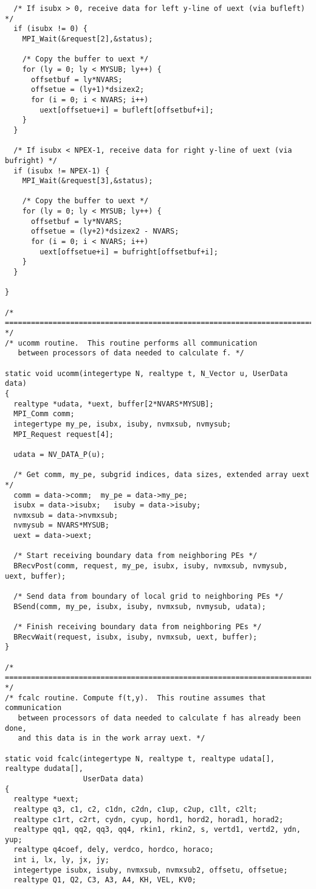 \begin{verbatim}
  /* If isubx > 0, receive data for left y-line of uext (via bufleft) */
  if (isubx != 0) {
    MPI_Wait(&request[2],&status);

    /* Copy the buffer to uext */
    for (ly = 0; ly < MYSUB; ly++) {
      offsetbuf = ly*NVARS;
      offsetue = (ly+1)*dsizex2;
      for (i = 0; i < NVARS; i++)
        uext[offsetue+i] = bufleft[offsetbuf+i];
    }
  }

  /* If isubx < NPEX-1, receive data for right y-line of uext (via bufright) */
  if (isubx != NPEX-1) {
    MPI_Wait(&request[3],&status);

    /* Copy the buffer to uext */
    for (ly = 0; ly < MYSUB; ly++) {
      offsetbuf = ly*NVARS;
      offsetue = (ly+2)*dsizex2 - NVARS;
      for (i = 0; i < NVARS; i++)
        uext[offsetue+i] = bufright[offsetbuf+i];
    }
  }

}

/* ======================================================================= */
/* ucomm routine.  This routine performs all communication 
   between processors of data needed to calculate f. */

static void ucomm(integertype N, realtype t, N_Vector u, UserData data)
{
  realtype *udata, *uext, buffer[2*NVARS*MYSUB];
  MPI_Comm comm;
  integertype my_pe, isubx, isuby, nvmxsub, nvmysub;
  MPI_Request request[4];

  udata = NV_DATA_P(u);

  /* Get comm, my_pe, subgrid indices, data sizes, extended array uext */
  comm = data->comm;  my_pe = data->my_pe;
  isubx = data->isubx;   isuby = data->isuby;
  nvmxsub = data->nvmxsub;
  nvmysub = NVARS*MYSUB;
  uext = data->uext;

  /* Start receiving boundary data from neighboring PEs */
  BRecvPost(comm, request, my_pe, isubx, isuby, nvmxsub, nvmysub, uext, buffer);

  /* Send data from boundary of local grid to neighboring PEs */
  BSend(comm, my_pe, isubx, isuby, nvmxsub, nvmysub, udata);

  /* Finish receiving boundary data from neighboring PEs */
  BRecvWait(request, isubx, isuby, nvmxsub, uext, buffer);
}

/* ======================================================================= */
/* fcalc routine. Compute f(t,y).  This routine assumes that communication 
   between processors of data needed to calculate f has already been done,
   and this data is in the work array uext. */

static void fcalc(integertype N, realtype t, realtype udata[], realtype dudata[], 
                  UserData data)
{
  realtype *uext;
  realtype q3, c1, c2, c1dn, c2dn, c1up, c2up, c1lt, c2lt;
  realtype c1rt, c2rt, cydn, cyup, hord1, hord2, horad1, horad2;
  realtype qq1, qq2, qq3, qq4, rkin1, rkin2, s, vertd1, vertd2, ydn, yup;
  realtype q4coef, dely, verdco, hordco, horaco;
  int i, lx, ly, jx, jy;
  integertype isubx, isuby, nvmxsub, nvmxsub2, offsetu, offsetue;
  realtype Q1, Q2, C3, A3, A4, KH, VEL, KV0;


\end{verbatim}
